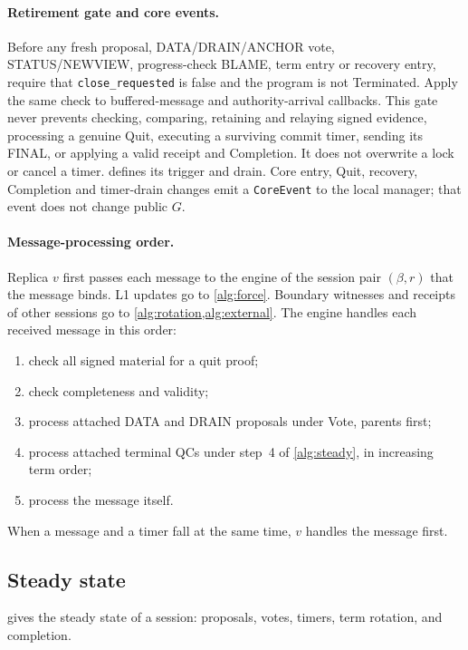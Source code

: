 \documentclass[11pt,a4paper]{article}
\newcommand{\RR}[1]{{\color{rrRed}#1}}
\begin{document}
\paragraph{Retirement gate and core events.}
Before any fresh proposal, DATA/DRAIN/ANCHOR vote, STATUS/NEWVIEW,
progress-check BLAME, term entry or recovery entry, require that
\texttt{close\_requested} is false and the program is not Terminated.
Apply the same check to buffered-message and authority-arrival callbacks.
This gate never prevents checking, comparing, retaining and relaying
signed evidence, processing a genuine Quit, executing a surviving commit
timer, sending its FINAL, or applying a valid receipt and Completion.
It does not overwrite a lock or cancel a timer. 
defines its trigger and drain. Core entry, Quit, recovery, Completion
and timer-drain changes emit a \texttt{CoreEvent} to the local manager;
that event does not change public $G$.

\paragraph{Message-processing order.}\leavevmode
\RR{Replica $v$ first passes each message to the engine of the session
pair $(\beta,r)$ that the message binds. L1 updates go to \cref{alg:force}. Boundary witnesses and receipts of
other sessions go to \cref{alg:rotation,alg:external}.} The engine handles each received
message in this order:
\begin{enumerate}[label=(\arabic*)]
\item check all signed material for a quit proof;
\item check completeness and validity;
\item process attached DATA \RR{and DRAIN} proposals under Vote, parents
first;
\item process attached terminal QCs under step~4 of \cref{alg:steady},
in increasing term order;
\item process the message itself.
\end{enumerate}
When a message and a timer fall at the same time, $v$ handles the
message first.

\subsection{Steady state}
\label{sec:steady}
 gives the steady state of a session: proposals, votes,
timers, term rotation, and completion.
\end{document}
